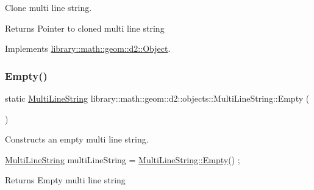Clone multi line string. 

\begin{DoxyReturn}{Returns}
Pointer to cloned multi line string 
\end{DoxyReturn}


Implements \hyperlink{classlibrary_1_1math_1_1geom_1_1d2_1_1_object_a5c26ae4120edb24f6463d65a9cef247d}{library\+::math\+::geom\+::d2\+::\+Object}.

\mbox{\label{classlibrary_1_1math_1_1geom_1_1d2_1_1objects_1_1_multi_line_string_aaa30610df3584b30f80e33ff0f5cd8bb}} 
\subsubsection{\texorpdfstring{Empty()}{Empty()}}
{\footnotesize\ttfamily static \hyperlink{classlibrary_1_1math_1_1geom_1_1d2_1_1objects_1_1_multi_line_string}{Multi\+Line\+String} library\+::math\+::geom\+::d2\+::objects\+::\+Multi\+Line\+String\+::\+Empty (\begin{DoxyParamCaption}{ }\end{DoxyParamCaption})\hspace{0.3cm}{\ttfamily [static]}}



Constructs an empty multi line string. 


\begin{DoxyCode}
\hyperlink{classlibrary_1_1math_1_1geom_1_1d2_1_1objects_1_1_multi_line_string_a8fd6c575f0489484f99c94c607631303}{MultiLineString} multiLineString = \hyperlink{classlibrary_1_1math_1_1geom_1_1d2_1_1objects_1_1_multi_line_string_aaa30610df3584b30f80e33ff0f5cd8bb}{MultiLineString::Empty}() ;
\end{DoxyCode}


\begin{DoxyReturn}{Returns}
Empty multi line string 
\end{DoxyReturn}
\mbox{\label{classlibrary_1_1math_1_1geom_1_1d2_1_1objects_1_1_multi_line_string_a38c15891b74932039b859b8978eb7b90}} 
